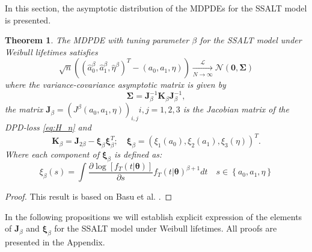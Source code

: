 \documentclass{article}
\newtheorem{theorem}{Theorem}
\begin{document}
In this section, the asymptotic distribution of the MDPDEs for the SSALT model is presented.
\begin{theorem}\label{thm:asymp}
The MDPDE with tuning parameter $\beta$ for the SSALT model under Weibull lifetimes satisfies
\begin{equation*}
\sqrt{n}\left(\left(\hat{a}_0^{\beta},\hat{a}_1^{\beta},\hat{\eta}^{\beta}\right)^T-(a_0,a_1,\eta)\right)\xrightarrow[N \to \infty]{\mathscr{L}} \mathcal{N}\left(\bm{0},\bm{\Sigma}\right)
\end{equation*}
where the variance-covariance asymptotic matrix is given by
\begin{equation*}
\boldsymbol{\Sigma}=\boldsymbol{J}_{\beta}^{-1}\boldsymbol{K}_{\beta}\boldsymbol{J}_{\beta}^{-1},
\end{equation*}
the matrix $\boldsymbol{J}_{\beta} = \left(J^{\beta}(a_0,a_1, \eta)\right)_{i,j} i, j=1,2,3$ is the Jacobian matrix of the DPD-loss \eqref{eq:H_n} 
and
\begin{equation*}
\mathbf{K}_{\beta}=\mathbf{J}_{2\beta}- \bm{\xi}_{\beta}\bm{\xi}_{\beta}^{T};
\quad 
\bm{\xi}_{\beta}=\left(
		\xi_1(a_0), 
		\xi_2(a_1), 
		\xi_3(\eta)
\right)^T.
\end{equation*}
Where each component of $\bm{\xi}_{\beta}$ is defined as:
\begin{equation*}
\xi_{\beta}(s)=\int \frac{\partial \log\left[f_{T}(t|\bm{\theta})\right] }{\partial s} f_{T}(t|\bm{\theta})^{\beta+1} dt \quad s \in \left\{a_0,a_1,\eta\right\}
\end{equation*}

\end{theorem}

\begin{proof}
This result is based on Basu et al. \cite{basu1997}.
\end{proof}
In the following propositions we will establish explicit expression of the elements of $\mathbf{J}_{\beta}$ and $\mathbf{\xi}_{\beta}$ for the SSALT model under Weibull lifetimes. All proofs are presented in the Appendix.
\end{document}

